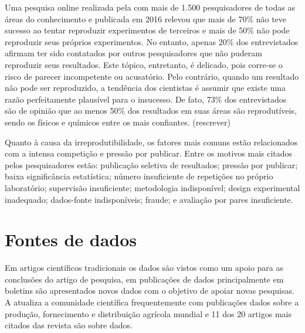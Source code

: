 Uma pesquisa online realizada pela  com mais de 1.500 pesquisadores de todas as áreas do conhecimento e publicada em 2016 relevou que mais de 70\% não teve sucesso ao tentar reproduzir experimentos de terceiros e mais de 50\% não pode reproduzir seus próprios experimentos. No entanto, apenas 20\% dos entrevistados afirmam ter sido contatados por outros pesquisadores que não puderam reproduzir seus resultados. Este tópico, entretanto, é delicado, pois corre-se o risco de parecer incompetente ou acusatório. Pelo contrário, quando um resultado não pode ser reproduzido, a tendência dos cientistas é assumir que existe uma razão perfeitamente plausível para o insucesso. De fato, 73\% dos entrevistados são de opinião que ao menos 50\% dos resultados em suas áreas são reprodutíveis, sendo os físicos e químicos entre os mais confiantes. (rescrever)

Quanto à causa da irreprodutibilidade, os fatores mais comuns estão relacionados com a intensa competição e pressão por publicar. Entre os motivos mais citados pelos pesquisadores estão: publicação seletiva de resultados; pressão por publicar; baixa significância estatística; número insuficiente de repetições no próprio laboratório; supervisão insuficiente; metodologia indisponível; design experimental inadequado; dados-fonte indisponíveis; fraude; e avaliação por pares insuficiente.


\section{Fontes de dados}



Em artigos científicos tradicionais os dados são vistos como um apoio para as conclusões do artigo de pesquisa, em publicações de dados principalmente em boletins são apresentados novos dados com o objetivo de apoiar novas pesquisas.
A   atualiza a comunidade científica frequentemente com publicações dados sobre a produção, fornecimento e distribuição agrícola mundial e 11 dos 20 artigos mais citados das revista  são sobre dados.

